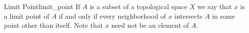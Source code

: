 \begin{definition}{Limit Point}{limit_point}
If \( A \) is a subset of a topological space \( X \) we say that \( x \) is a
limit point of \( A \) if and only if every neighborhood of \( x \) intersects
\( A \) in some point other than itself. Note that \( x \) need not be an
element of \( A \).
\end{definition}

